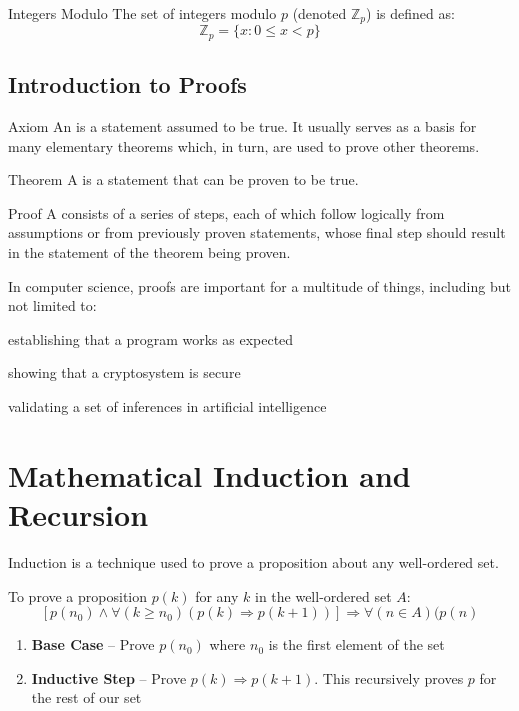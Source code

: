 \documentclass[12pt]{report}
\begin{document}

\begin{dfnbox}{Integers Modulo}
	The set of integers modulo $p$ (denoted $\mathbb{Z}_p$) is defined as:
	$$ \mathbb{Z}_p = \{ x : 0 \leq x < p \} $$
\end{dfnbox}

\section{Introduction to Proofs}
\begin{dfnbox}{Axiom}
	An  is a statement assumed to be true. It usually serves as a basis for many elementary theorems which, in turn, are used to prove other theorems.
\end{dfnbox}

\begin{dfnbox}{Theorem}
	A  is a statement that can be proven to be true.
\end{dfnbox}

\begin{dfnbox}{Proof}
	A  consists of a series of steps, each of which follow logically from assumptions or from previously proven statements, whose final step should result in the statement of the theorem being proven.
\end{dfnbox}

In computer science, proofs are important for a multitude of things, including but not limited to:
\begin{dfnitems}
	\item establishing that a program works as expected
	\item showing that a cryptosystem is secure
	\item validating a set of inferences in artificial intelligence
\end{dfnitems}

\newpage
\chapter{Mathematical Induction and Recursion}

\begin{dfnbox}{Induction}
	 is a technique used to prove a proposition about any well-ordered set.
	
	To prove a proposition $p(k)$ for any $k$ in the well-ordered set $A$:
	$$\left[ p(n_0) \land \forall (k \geq n_0) (p(k) \Rightarrow p(k+1)) \right] \Rightarrow \forall(n \in A)(p(n)$$
	\begin{enumerate}
		\item \textbf{Base Case} -- Prove $p(n_0)$ where $n_0$ is the first element of the set
		\item \textbf{Inductive Step} -- Prove $p(k) \Rightarrow p(k+1)$. This recursively proves $p$ for the rest of our set
	\end{enumerate}
\end{dfnbox}
\end{document}
